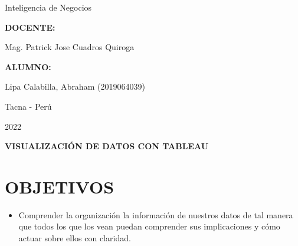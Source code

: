 \documentclass[12pt,letterpaper]{article}
\begin{document}
\begin{titlepage}
\begin{center}
\begin{large}
                Inteligencia de Negocios\\
            \end{large}
            \vspace*{0.2in}
            \begin{Large}
                \textbf{DOCENTE:} \\
            \end{Large}
            \vspace*{0.1in}
            \begin{large}
                Mag. Patrick Jose Cuadros Quiroga\\
            \end{large}
            \vspace*{0.3in}
            \begin{large}
                \textbf{ALUMNO:} \\
                \begin{flushleft}
                    Lipa Calabilla, Abraham  		\hfill	(2019064039) \\
                \end{flushleft}
            \end{large}
            \vspace*{1.3in}
            \begin{large}
                Tacna - Perú\\
            \end{large}
            \vspace*{0.1in}
            \begin{large}
                2022\\
            \end{large}
        \end{center}
    \end{titlepage}
    
    \newpage
    \tableofcontents
    \justify
    \newpage
    \begin{LARGE}
        \begin{center}
            \textbf{VISUALIZACIÓN DE DATOS CON TABLEAU} \\
        \end{center}
    \end{LARGE}
    \section{OBJETIVOS}
    \begin{itemize}
        \item Comprender la organización la información de nuestros datos de tal manera que todos los que los vean puedan comprender sus implicaciones y cómo actuar sobre ellos con claridad.
    \end{itemize}
\end{document}
